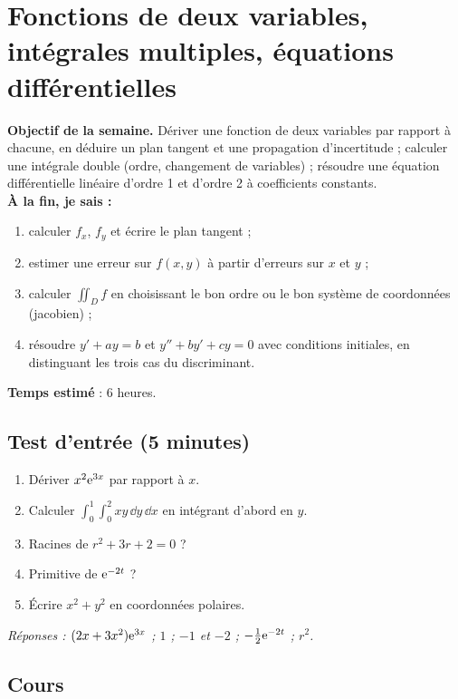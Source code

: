 \clearpage
\section{Fonctions de deux variables, intégrales multiples, équations différentielles}
\renewcommand{\titrecourant}{Semaine 7}

\begin{boussole}
\textbf{Objectif de la semaine.} Dériver une fonction de deux variables par rapport à chacune, en déduire un plan tangent et une propagation d'incertitude ; calculer une intégrale double (ordre, changement de variables) ; résoudre une équation différentielle linéaire d'ordre 1 et d'ordre 2 à coefficients constants.\\
\textbf{À la fin, je sais :}
\begin{enumerate}
 \item calculer $f_x$, $f_y$ et écrire le plan tangent ;
 \item estimer une erreur sur $f(x,y)$ à partir d'erreurs sur $x$ et $y$ ;
 \item calculer $\iint_D f$ en choisissant le bon ordre ou le bon système de coordonnées (jacobien) ;
 \item résoudre $y'+ay=b$ et $y''+by'+cy=0$ avec conditions initiales, en distinguant les trois cas du discriminant.
\end{enumerate}
\textbf{Temps estimé} : 6 heures.
\end{boussole}

\subsection{Test d'entrée (5 minutes)}
\begin{enumerate}
 \item Dériver $x^2\mathrm{e}^{3x}$ par rapport à $x$.
 \item Calculer $\int_0^1\int_0^2 xy\,\dd y\,\dd x$ en intégrant d'abord en $y$.
 \item Racines de $r^2+3r+2=0$ ?
 \item Primitive de $\mathrm{e}^{-2t}$ ?
 \item Écrire $x^2+y^2$ en coordonnées polaires.
\end{enumerate}
\textit{Réponses : $(2x+3x^2)\mathrm{e}^{3x}$ ; $1$ ; $-1$ et $-2$ ; $-\frac12\mathrm{e}^{-2t}$ ; $r^2$.}

\subsection{Cours}

